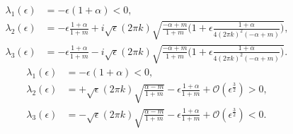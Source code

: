 \documentclass[a4paper,11pt]{article}
\theoremstyle{remark}
\begin{document}
\begin{align*}
 \lambda_1(\epsilon) &= -\epsilon(1+\alpha)<0,\\
 \lambda_2(\epsilon) &= - \epsilon\frac{1+\alpha}{1+m} + i\sqrt{\epsilon}(2\pi k)\sqrt{\frac{-\alpha+m}{1+m}\Big(1+\epsilon \frac{1+\alpha}{4(2\pi k)^2(-\alpha+m)}\Big)},\\ 
 \lambda_3(\epsilon) &= - \epsilon\frac{1+\alpha}{1+m} - i\sqrt{\epsilon}(2\pi k)\sqrt{\frac{-\alpha+m}{1+m}\Big(1+\epsilon \frac{1+\alpha}{4(2\pi k)^2(-\alpha+m)}\Big)}.
\end{align*}
\begin{align*}
 \lambda_1(\epsilon) &= -\epsilon(1+\alpha)<0,\\
 \lambda_2(\epsilon) &= +\sqrt{\epsilon} (2\pi k)\sqrt{\frac{\alpha-m}{1+m}} - \epsilon\frac{1+\alpha}{1+m} + \mathcal{O}(\epsilon^{\frac{3}{2}}) > 0,\\
 \lambda_3(\epsilon) &= -\sqrt{\epsilon} (2\pi k)\sqrt{\frac{\alpha-m}{1+m}} - \epsilon\frac{1+\alpha}{1+m} + \mathcal{O}(\epsilon^{\frac{3}{2}}) < 0.\\
\end{align*}
\end{document}
